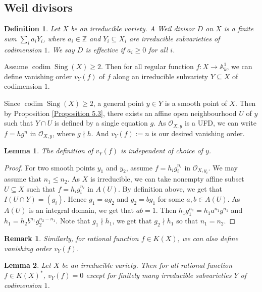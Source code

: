 \documentclass{ctexart}
\newtheorem{definition}{Definition}[section]
\newtheorem{remark}{Remark}[section]
\newtheorem{lemma}{Lemma}[section]
\newcommand{\codim}{\operatorname{codim}}
\newcommand{\singular}{\operatorname{Sing}}
\begin{document}
\subsection{Weil divisors}
\label{subsection:Divisors_Weil_divisors}

\begin{definition}
    Let $X$ be an irreducible variety.
    A Weil divisor $D$ on $X$ is a finite sum $\sum_{i} a_{i}Y_{i}$,
    where $a_{i}\in \mathbb{Z}$ and $Y_{i} \subseteq X_{i}$ are irreducible subvarieties of codimension $1$.
    We say $D$ is effective if $a_{i} \ge 0$ for all $i$.
\end{definition}
Assume $\codim \singular (X) \ge 2$.
Then for all regular function $f: X \rightarrow \mathbb{A}_{k}^{1}$,
we can define vanishing order $v_{Y}(f)$ of $f$ along an irreducible subvariety $Y \subseteq X$ of codimension $1$.
\par
Since $\codim \singular (X) \ge 2$, a general point $y\in Y$ is a smooth point of $X$.
Then by Proposition \ref{Proposition 5.3}, there exists an affine open neighbourhood $U$ of $y$ such that $Y \cap U$ is defined by a single equation $g$.
As $\mathcal{O}_{X, y}$ is a UFD, we can write $f = hg^{n}$ in $\mathcal{O}_{X, y}$, where $g \nmid h$.
And $v_{Y}(f) := n$ is our desired vanishing order.
\begin{lemma}
    The definition of $v_{Y}(f)$ is independent of choice of $y$.
    \label{Lemma 7.3}
\end{lemma}
\begin{proof}
    For two smooth points $y_{1}$ and $y_{2}$, assume $f = h_{i}g_{i}^{n_{i}}$ in $\mathcal{O}_{X, y_{i}}$.
    We may assume that $n_{1} \le n_{2}$.
    As $X$ is irreducible, we can take nonempty affine subset $U \subseteq X$ such that $f = h_{i}g_{i}^{n_{i}}$ in $A(U)$.
    By definition above, we get that $I(U \cap Y) = (g_{i})$.
    Hence $g_{1} = ag_{2}$ and $g_{2} = bg_{1}$ for some $a,b\in A(U)$.
    As $A(U)$ is an integral domain, we get that $ab = 1$.
    Then $h_{1}g_{1}^{n_{1}} = h_{1}a^{n_{1}}g^{n_{1}}$ and $h_{1} = h_{2}b^{n_{1}}g_{2}^{n_{2} - n_{1}}$.
    Note that $g_{1} \nmid h_{1}$, we get that $g_{2} \nmid h_{1}$ so that $n_{1} = n_{2}$.
\end{proof}
\begin{remark}
    Similarly, for rational function $f\in K(X)$, we can also define vanishing order $v_{Y}(f)$.
\end{remark}
\begin{lemma}
    Let $X$ be an irreducible variety.
    Then for all rational function $f\in K(X)^{\ast}$, $v_{Y}(f) = 0$ except for finitely many irreducible subvarieties $Y$ of codimension $1$.
    \label{Lemma 7.4}
\end{lemma}
\end{document}
